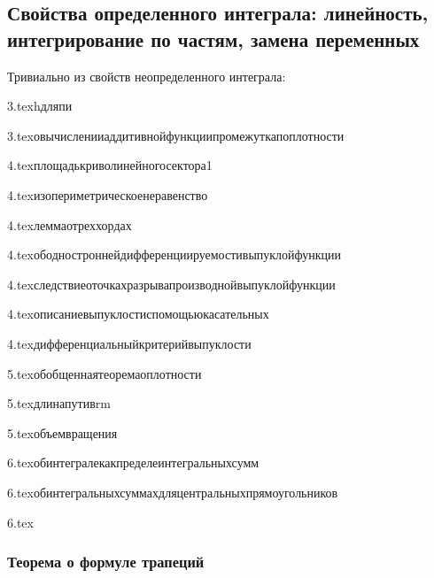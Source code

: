 \subsection{Свойства определенного интеграла: линейность, интегрирование по частям, замена переменных}
Тривиально из свойств неопределенного интеграла: 

{3.tex}{hдляпи}

{3.tex}{овычисленииаддитивнойфункциипромежуткапоплотности}

{4.tex}{площадькриволинейногосектора1}

{4.tex}{изопериметрическоенеравенство}

{4.tex}{леммаотреххордах}

{4.tex}{ободностроннейдифференциируемостивыпуклойфункции}

{4.tex}{следствиеоточкахразрывапроизводнойвыпуклойфункции}

{4.tex}{описаниевыпуклостиспомощьюкасательных}

{4.tex}{дифференциальныйкритерийвыпуклости}

{5.tex}{обобщеннаятеоремаоплотности}

{5.tex}{длинапутивrm}

{5.tex}{объемвращения}

{6.tex}{обинтегралекакпределеинтегральныхсумм}

{6.tex}{обинтегральныхсуммахдляцентральныхпрямоугольников}

{6.tex}{}
\subsubsection{Теорема о формуле трапеций}
